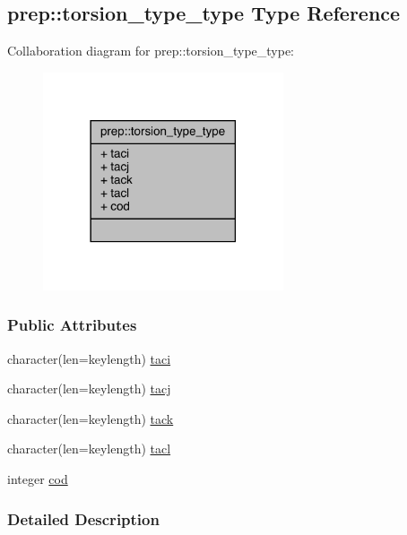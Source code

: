 \hypertarget{structprep_1_1torsion__type__type}{\subsection{prep\-:\-:torsion\-\_\-type\-\_\-type Type Reference}
\label{structprep_1_1torsion__type__type}
}


Collaboration diagram for prep\-:\-:torsion\-\_\-type\-\_\-type\-:
\nopagebreak
\begin{figure}[H]
\begin{center}
\leavevmode
\includegraphics[width=201pt]{structprep_1_1torsion__type__type__coll__graph}
\end{center}
\end{figure}
\subsubsection*{Public Attributes}
\begin{DoxyCompactItemize}
\item 
character(len=keylength) \hyperlink{structprep_1_1torsion__type__type_abf17ef2a5210195adb48303837d01da8}{taci}
\item 
character(len=keylength) \hyperlink{structprep_1_1torsion__type__type_a991856b59c2a06950f8905cb4fe28d6a}{tacj}
\item 
character(len=keylength) \hyperlink{structprep_1_1torsion__type__type_ac1ca3f8ddcb778ca50d16147528cd72d}{tack}
\item 
character(len=keylength) \hyperlink{structprep_1_1torsion__type__type_ac399c47ba9106910e6f1aedc204190dc}{tacl}
\item 
integer \hyperlink{structprep_1_1torsion__type__type_a75a1521b777c2d3d0dcab07dbd79f9a7}{cod}
\end{DoxyCompactItemize}


\subsubsection{Detailed Description}


